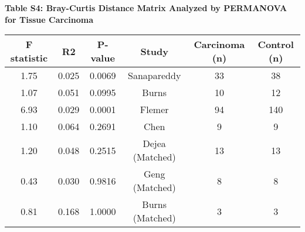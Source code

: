 \documentclass[12pt,]{article}
\begin{document}
\newpage

\textbf{Table S4: Bray-Curtis Distance Matrix Analyzed by PERMANOVA for
Tissue Carcinoma}

\begin{longtable}[]{@{}cccccc@{}}
\toprule
F statistic & R2 & P-value & Study & Carcinoma (n) & Control
(n)\tabularnewline
\midrule
\endhead
1.75 & 0.025 & 0.0069 & Sanapareddy & 33 & 38\tabularnewline
1.07 & 0.051 & 0.0995 & Burns & 10 & 12\tabularnewline
6.93 & 0.029 & 0.0001 & Flemer & 94 & 140\tabularnewline
1.10 & 0.064 & 0.2691 & Chen & 9 & 9\tabularnewline
1.20 & 0.048 & 0.2515 & Dejea (Matched) & 13 & 13\tabularnewline
0.43 & 0.030 & 0.9816 & Geng (Matched) & 8 & 8\tabularnewline
0.81 & 0.168 & 1.0000 & Burns (Matched) & 3 & 3\tabularnewline
\bottomrule
\end{longtable}
\end{document}
